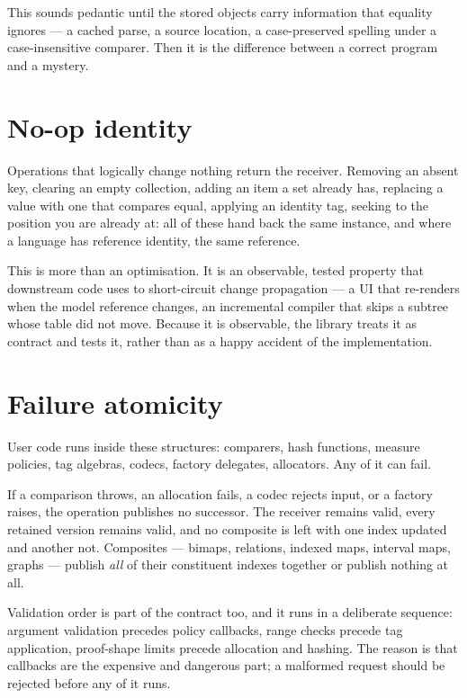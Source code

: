 \documentclass[11pt,twoside,openright]{book}
\begin{document}
This sounds pedantic until the stored objects carry information that equality
ignores --- a cached parse, a source location, a case-preserved spelling under a
case-insensitive comparer. Then it is the difference between a correct program
and a mystery.

\section{No-op identity}

Operations that logically change nothing return the receiver. Removing an absent
key, clearing an empty collection, adding an item a set already has, replacing a
value with one that compares equal, applying an identity tag, seeking to the
position you are already at: all of these hand back the same instance, and where
a language has reference identity, the same reference.

This is more than an optimisation. It is an observable, tested property that
downstream code uses to short-circuit change propagation --- a UI that re-renders
when the model reference changes, an incremental compiler that skips a
subtree whose table did not move. Because it is observable, the library treats it
as contract and tests it, rather than as a happy accident of the implementation.

\section{Failure atomicity}

User code runs inside these structures: comparers, hash functions, measure
policies, tag algebras, codecs, factory delegates, allocators. Any of it can
fail.

\begin{contractbox}
If a comparison throws, an allocation fails, a codec rejects input, or a factory
raises, the operation publishes no successor. The receiver remains valid, every
retained version remains valid, and no composite is left with one index updated
and another not. Composites --- bimaps, relations, indexed maps, interval maps,
graphs --- publish \emph{all} of their constituent indexes together or publish
nothing at all.
\end{contractbox}

Validation order is part of the contract too, and it runs in a deliberate
sequence: argument validation precedes policy callbacks, range checks precede tag
application, proof-shape limits precede allocation and hashing. The reason is
that callbacks are the expensive and dangerous part; a malformed request should
be rejected before any of it runs.
\end{document}
